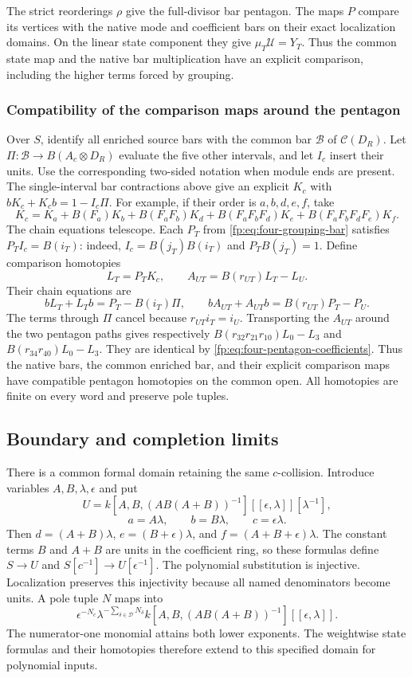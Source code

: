 The strict reorderings \(\rho\) give the full-divisor bar pentagon.
The maps \(P\) compare its vertices with the native mode and
coefficient bars on their exact localization domains.  On the linear
state component they give \(\mu_T\mathcal U=Y_T\).
Thus the common state map and the native bar multiplication have an
explicit comparison, including the higher terms forced by grouping.

\subsubsection{Compatibility of the comparison maps around the pentagon}

Over \(S\), identify all enriched source bars with the common
bar \(\mathcal B\) of \(\mathcal C(D_R)\).
Let \(\Pi:\mathcal B\to B(A_c\otimes D_R)\) evaluate
the five other intervals, and let \(I_c\) insert their units.
Use the corresponding two-sided notation when module ends are present.
The single-interval bar contractions above give an explicit
\(K_c\) with \(bK_c+K_cb=1-I_c\Pi\).
For example, if their order is \(a,b,d,e,f\), take
\[
 K_c=K_a+B(F_a)K_b+B(F_aF_b)K_d
       +B(F_aF_bF_d)K_e+B(F_aF_bF_dF_e)K_f.
\]
The chain equations telescope.  Each \(P_T\) from
\eqref{fp:eq:four-grouping-bar} satisfies
\(P_TI_c=B(i_T)\): indeed, \(I_c=B(j_T)B(i_T)\)
and \(P_TB(j_T)=1\).
Define comparison homotopies
\[
 L_T=P_TK_c,\qquad
 A_{UT}=B(r_{UT})L_T-L_U.
\]
Their chain equations are
\[
 bL_T+L_Tb=P_T-B(i_T)\Pi,
 \qquad bA_{UT}+A_{UT}b=B(r_{UT})P_T-P_U.
\]
The terms through \(\Pi\) cancel because
\(r_{UT}i_T=i_U\).  Transporting the \(A_{UT}\) around
the two pentagon paths gives respectively
\(B(r_{32}r_{21}r_{10})L_0-L_3\) and
\(B(r_{34}r_{40})L_0-L_3\).  They are identical by
\eqref{fp:eq:four-pentagon-coefficients}.
Thus the native bars, the common enriched bar, and their explicit
comparison maps have compatible pentagon homotopies on the common open.
All homotopies are finite on every word and preserve pole tuples.

\subsection{Boundary and completion limits}
\label{fp:sec:four-boundary-limits}

There is a common formal domain retaining the same \(c\)-collision.
Introduce variables \(A,B,\lambda,\epsilon\) and put
\[
 U=k[A,B,(AB(A+B))^{-1}][[\epsilon,\lambda]][\lambda^{-1}],
\]
\[
 a=A\lambda,\qquad b=B\lambda,\qquad c=\epsilon\lambda.
\]
Then \(d=(A+B)\lambda\), \(e=(B+\epsilon)\lambda\),
and \(f=(A+B+\epsilon)\lambda\).
The constant terms \(B\) and \(A+B\) are units in the
coefficient ring, so these formulas define
\(S\to U\) and \(S[c^{-1}]\to U[\epsilon^{-1}]\).
The polynomial substitution is injective.  Localization preserves
this injectivity because all named denominators become units.
A pole tuple \(N\) maps into
\[
 \epsilon^{-N_c}\lambda^{-\sum_{\delta\in\mathcal D}N_\delta}
 k[A,B,(AB(A+B))^{-1}][[\epsilon,\lambda]].
\]
The numerator-one monomial attains both lower exponents.
The weightwise state formulas and their homotopies therefore extend
to this specified domain for polynomial inputs.


